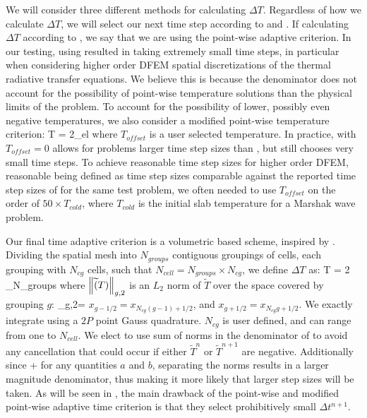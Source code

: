 We will consider three different methods for calculating $\Delta T$.  
Regardless of how we calculate $\Delta T$, we will select our next time step according to  and .
If calculating $\Delta T$ according to , we say that we are using the point-wise adaptive criterion.
In our testing, using  resulted in taking extremely small time steps, in particular when considering higher order DFEM spatial discretizations of the thermal radiative transfer equations.
We believe this is because the denominator does not account for the possibility of point-wise temperature solutions than the physical limits of the problem.
To account for the possibility of lower, possibly even negative temperatures, we also consider a modified point-wise temperature criterion:
\benum
\Delta T = 2\max_{el}  \pec
\label{eq:modified_pointwise_adaptive}
\eenum
where $T_{offset}$ is a user selected temperature.  
In practice,  with $T_{offset} = 0$ allows for problems larger time step sizes than , but still chooses very small time steps.
To achieve reasonable time step sizes for higher order DFEM, reasonable being defined as time step sizes comparable against the reported time step sizes of \cite{time_adaptive_diffusion} for the same test problem, we often needed to use $T_{offset}$ on the order of $50\times T_{cold}$, where $T_{cold}$ is the initial slab temperature for a Marshak wave problem.

Our final time adaptive criterion is a volumetric based scheme, inspired by .
Dividing the spatial mesh into $N_{groups}$ contiguous groupings of cells, each grouping with $N_{cg}$ cells, such that $N_{cell} = N_{groups} \times N_{cg}$, we define $\Delta T$ as:
\benum
\Delta T = 2 \max_{N_{groups}}  \pec
\label{eq:volumetric_adaptive}
\eenum
where $\left\lVert  \widetilde(T)  \right\rVert_{g,2}$ is an $L_2$ norm of $\widetilde{T}$ over the space covered by grouping $g$:
\benum
{}_{g,2}= \pec
\label{eq:group_integral}
\eenum
$x_{g-1/2} = x_{N_{cg} (g-1)+1/2}$, and $x_{g+1/2} = x_{N_{cg} g +1/2}$.  
We exactly integrate  using a $2P$ point Gauss quadrature.  
$N_{cg}$ is user defined, and can range from one to $N_{cell}$.
We elect to use sum of norms in the denominator of  to avoid any cancellation that could occur if either $\widetilde{T}^n$ or $\widetilde{T}^{n+1}$ are negative.
Additionally since
\benum
{} \leq {} +  \pec
\eenum
for any quantities $a$ and $b$, separating the norms results in a larger magnitude denominator, thus making it more likely that larger step sizes will be taken.  
As will be seen in , the main drawback of the point-wise and modified point-wise adaptive time criterion is that they select prohibitively small $\Delta t^{n+1}$.

